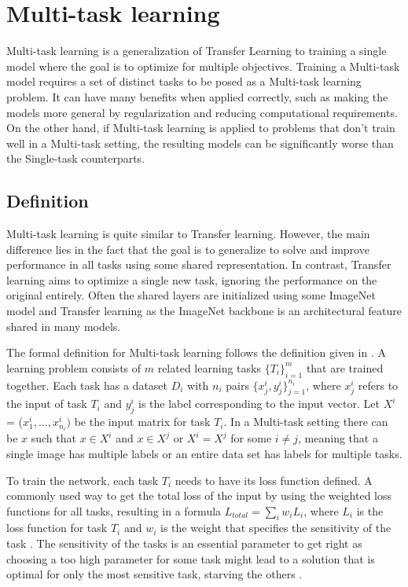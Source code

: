 \chapter{Multi-task learning}
Multi-task learning is a generalization of Transfer Learning to training a single model where the goal is to optimize for multiple objectives.
Training a Multi-task model requires a set of distinct tasks to be posed as a Multi-task learning problem.
It can have many benefits when applied correctly, such as making the models more general by regularization and reducing computational requirements.
On the other hand, if Multi-task learning is applied to problems that don't train well in a Multi-task setting, the resulting models can be significantly worse than the Single-task counterparts.

\section{Definition}
Multi-task learning is quite similar to Transfer learning.
However, the main difference lies in the fact that the goal is to generalize to solve and improve performance in all tasks using some shared representation.
In contrast, Transfer learning aims to optimize a single new task, ignoring the performance on the original entirely.
Often the shared layers are initialized using some ImageNet model and Transfer learning as the ImageNet backbone is an architectural feature shared in many models.

The formal definition for Multi-task learning follows the definition given in \citep{surveyOnMultiTask}.
A learning problem consists of ${m}$ related learning tasks ${\{T_i\}_{i=1}^m}$ that are trained together.
Each task has a dataset ${D_i}$ with ${n_i}$ pairs ${\{x_{j}^{i}, y_{j}^{i}\}_{j=1}^{n_i}}$, where ${x_{j}^{i}}$ refers to the input of task ${T_i}$ and ${y_{j}^{i}}$ is the label corresponding to the input vector.
Let ${X^i}$ = (${x_{1}^{i}, ... , x_{n_i}^{i})}$ be the input matrix for task ${T_i}$.
In a Multi-task setting there can be ${x}$ such that ${x \in X^i}$ and ${x \in X^j}$ or ${X^i = X^j}$ for some ${i \ne j}$, meaning that a single image has multiple labels or an entire data set has labels for multiple tasks.

To train the network, each task ${T_i}$ needs to have its loss function defined.
A commonly used way to get the total loss of the input by using the weighted loss functions for all tasks, resulting in a formula ${L_{total} = \sum_i{w_i L_i}}$, where ${L_i}$ is the loss function for task ${T_i}$ and ${w_i}$ is the weight that specifies the sensitivity of the task \citep{usingUncertaintyToWeighLosses}.
The sensitivity of the tasks is an essential parameter to get right as choosing a too high parameter for some task might lead to a solution that is optimal for only the most sensitive task, starving the others \citep{whichTasks}.

